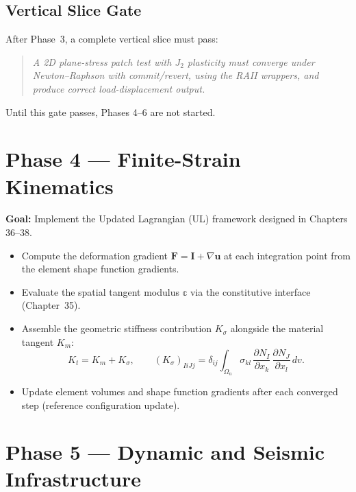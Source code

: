 \subsection*{Vertical Slice Gate}

After Phase~3, a complete vertical slice must pass:
\begin{quote}
  \emph{A 2D plane-stress patch test with $J_2$ plasticity must converge
  under Newton--Raphson with commit/revert, using the RAII wrappers,
  and produce correct load-displacement output.}
\end{quote}

Until this gate passes, Phases 4--6 are not started.

\section{Phase 4 — Finite-Strain Kinematics}
\label{sec:phase4-overview}

\textbf{Goal:} Implement the Updated Lagrangian (UL) framework designed
in Chapters 36--38.

\begin{itemize}
  \item Compute the deformation gradient
        $\mathbf{F} = \mathbf{I} + \nabla \mathbf{u}$ at each
        integration point from the element shape function gradients.
  \item Evaluate the spatial tangent modulus
        $\mathbb{c}$ via the constitutive interface
        (Chapter~35).
  \item Assemble the geometric stiffness contribution
        $K_{\sigma}$ alongside the material tangent $K_m$:
        \[
          K_t = K_m + K_\sigma, \qquad
          (K_\sigma)_{IiJj}
            = \delta_{ij} \int_{\Omega_n} \sigma_{kl}\,
              \frac{\partial N_I}{\partial x_k}\,
              \frac{\partial N_J}{\partial x_l}\,dv.
        \]
  \item Update element volumes and shape function gradients after each
        converged step (reference configuration update).
\end{itemize}

\section{Phase 5 — Dynamic and Seismic Infrastructure}
\label{sec:phase5-overview}

